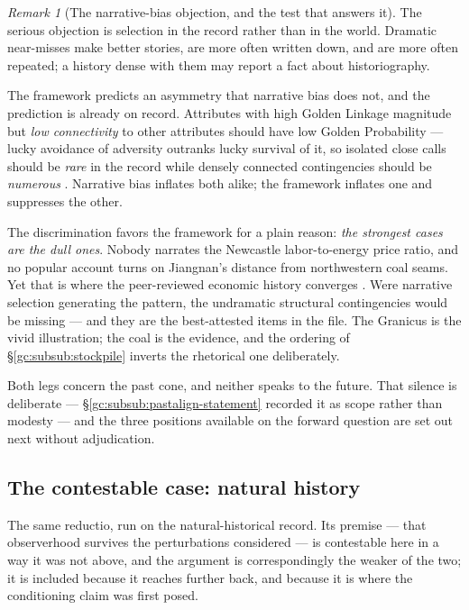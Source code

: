 \documentclass[11pt]{article}
\numberwithin{equation}{section}
\theoremstyle{plain}
\theoremstyle{definition}
\theoremstyle{remark}
\newtheorem{remark}[theorem]{Remark}
\begin{document}
\begin{remark}[The narrative-bias objection, and the test that answers
it]\label{gc:rem:narrativebias}
The serious objection is selection in the record rather than in the
world. Dramatic near-misses make better stories, are more often written
down, and are more often repeated; a history dense with them may report
a fact about historiography.

The framework predicts an asymmetry that narrative bias does not, and
the prediction is already on record. Attributes with high Golden Linkage
magnitude but \emph{low connectivity} to other attributes should have
low Golden Probability --- lucky avoidance of adversity outranks lucky
survival of it, so isolated close calls should be \emph{rare} in the
record while densely connected contingencies should be
\emph{numerous} \cite{GoldenScience22}. Narrative bias inflates both
alike; the framework inflates one and suppresses the other.

The discrimination favors the framework for a plain reason: \emph{the strongest cases are the dull ones}. Nobody narrates
the Newcastle labor-to-energy price ratio, and no popular account turns
on Jiangnan's distance from northwestern coal seams. Yet that is where
the peer-reviewed economic history converges \cite{Pomeranz00,
Allen09}. Were narrative selection generating the pattern, the
undramatic structural contingencies would be missing --- and they are
the best-attested items in the file. The Granicus is the vivid
illustration; the coal is the evidence, and the ordering of
\S\ref{gc:subsub:stockpile} inverts the rhetorical one deliberately.
\end{remark}


Both legs concern the past cone, and neither speaks to the future. That
silence is deliberate --- \S\ref{gc:subsub:pastalign-statement} recorded
it as scope rather than modesty --- and the three positions available on
the forward question are set out next without adjudication.

\subsection{The contestable case: natural history}\label{gc:sub:naturalhistory}

The same reductio, run on the natural-historical record. Its premise
--- that observerhood survives the perturbations considered --- is
contestable here in a way it was not above, and the argument is
correspondingly the weaker of the two; it is included because it reaches
further back, and because it is where the conditioning claim was first
posed.
\end{document}
